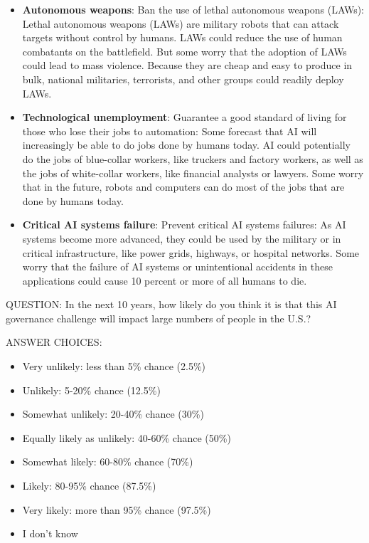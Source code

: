 \documentclass{article}
\begin{document}
\begin{itemize}
\item \textbf{Autonomous weapons}: Ban the use of lethal autonomous weapons (LAWs): Lethal autonomous weapons (LAWs) are military robots that can attack targets without control by humans. LAWs could reduce the use of human combatants on the battlefield. But some worry that the adoption of LAWs could lead to mass violence. Because they are cheap and easy to produce in bulk, national militaries, terrorists, and other groups could readily deploy LAWs.
\item \textbf{Technological unemployment}: Guarantee a good standard of living for those who lose their jobs to automation: Some forecast that AI will increasingly be able to do jobs done by humans today. AI could potentially do the jobs of blue-collar workers, like truckers and factory workers, as well as the jobs of white-collar workers, like financial analysts or lawyers. Some worry that in the future, robots and computers can do most of the jobs that are done by humans today.
\item \textbf{Critical AI systems failure}: Prevent critical AI systems failures: As AI systems become more advanced, they could be used by the military or in critical infrastructure, like power grids, highways, or hospital networks. Some worry that the failure of AI systems or unintentional accidents in these applications could cause 10 percent or more of all humans to die.
\end{itemize}

\noindent QUESTION: In the next 10 years, how likely do you think it is that this AI governance challenge will impact large numbers of people in the U.S.?

\noindent ANSWER CHOICES:

\begin{itemize}
\item Very unlikely: less than 5\% chance (2.5\%)
\item Unlikely: 5-20\% chance (12.5\%)
\item Somewhat unlikely: 20-40\% chance (30\%)
\item Equally likely as unlikely: 40-60\% chance (50\%)
\item Somewhat likely: 60-80\% chance (70\%)
\item Likely: 80-95\% chance (87.5\%)
\item Very likely: more than 95\% chance (97.5\%)
\item I don’t know
\end{itemize}
\end{document}
